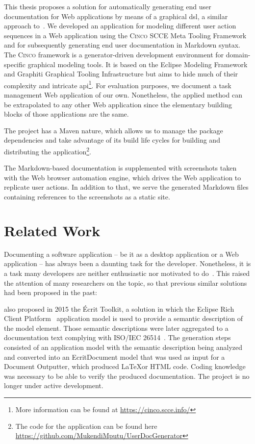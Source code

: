 This thesis proposes a solution for automatically generating end user documentation for Web applications by means of a graphical \gls*{dsl}, a similar approach to~\cite{bosselmann-et_al}. We developed an application for modeling different user action sequences in a Web application using the \textsc{Cinco} SCCE Meta Tooling Framework~\cite{Cinco} and for subsequently generating end user documentation in Markdown syntax. The \textsc{Cinco} framework is a generator-driven development environment for domain-specific graphical modeling tools. It is based on the Eclipse Modeling Framework and Graphiti Graphical Tooling Infrastructure but aims to hide much of their complexity and intricate \gls{api}\footnote{More information can be found at \url{https://cinco.scce.info/}}. For evaluation purposes, we document a task management Web application of our own. Nonetheless, the applied method can be extrapolated to any other Web application since the elementary building blocks of those applications are the same.

The project has a Maven nature, which allows us to manage the package dependencies and take advantage of its build life cycles for building and distributing the application\footnote{The code for the application can be found here \url{https://github.com/MukendiMputu/UserDocGenerator}}.

The Markdown-based documentation is supplemented with screenshots taken with the Web browser automation engine, which drives the Web application to replicate user actions. In addition to that, we serve the generated Markdown files containing references to the screenshots as a static site.

\section{Related Work}\label{sec:relWork}

Documenting a software application -- be it as a desktop application or a Web application -- has always been a daunting task for the developer. Nonetheless, it is a task many developers are neither enthusiastic nor motivated to do~\cite{kipyegen2013importance}. This raised the attention of many researchers on the topic, so that previous similar solutions had been proposed in the past:

\cite{descher_et-al} also proposed in 2015 the Écrit Toolkit, a solution in which the Eclipse Rich Client Platform~\cite{eclipseRCP} application model is used to provide a semantic description of the model element. Those semantic descriptions were later aggregated to a documentation text complying with ISO/IEC 26514~\cite{descher_et-al}. The generation steps consisted of an application model with the semantic description being analyzed and converted into an EcritDocument model that was used as input for a Document Outputter, which produced \LaTeX or HTML code. Coding knowledge was necessary to be able to verify the produced documentation. The project is no longer under active development.

